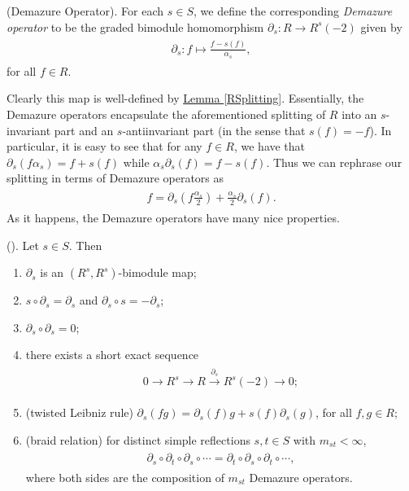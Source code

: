 \noindent\begin{definition}\textup{(Demazure Operator).} For each $s \in S$, we define the corresponding {\em Demazure operator} to be the graded bimodule homomorphism $\partial_s : R \to R^s(-2)$ given by
\begin{align*}
\begin{split}
\partial_s : f \mapsto \frac{f - s(f)}{\alpha_s},
\end{split}
\end{align*}
for all $f \in R$.\\
\end{definition}

\noindent Clearly this map is well-defined by \hyperref[RSplitting]{Lemma \ref*{RSplitting}}. Essentially, the Demazure operators encapsulate the aforementioned splitting of $R$ into an $s$-invariant part and an $s$-antiinvariant part (in the sense that $s(f) = -f$). In particular, it is easy to see that for any $f \in R$, we have that $\partial_s(f\alpha_s) = f + s(f)$ while $\alpha_s\partial_s(f) = f - s(f)$. Thus we can rephrase our splitting in terms of Demazure operators as
\begin{align*}
\begin{split}
f = \partial_s\left(f\frac{\alpha_s}{2}\right) + \frac{\alpha_s}{2}\partial_s(f).
\end{split}
\end{align*}
\noindent As it happens, the Demazure operators have many nice properties.\\

\noindent\begin{lemma}\textup{(\cite[Lemma 4.15]{EMTW20}).} Let $s \in S$. Then
\begin{enumerate}[label=\textup{(\roman*).}, ref=\textup{(\roman*)}, leftmargin=4\parindent]
\item $\partial_s$ is an $(R^s, R^s)$-bimodule map;
\item $s \circ \partial_s = \partial_s$ and $\partial_s \circ s = -\partial_s$;
\item $\partial_s \circ \partial_s = 0$;
\item there exists a short exact sequence
\begin{align*}
\begin{split}
0 \to R^s \to R \overset{\partial_s}{\to} R^s(-2) \to 0;
\end{split}
\end{align*}
\item (twisted Leibniz rule) $\partial_s(fg) = \partial_s(f)g + s(f)\partial_s(g)$, for all $f, g \in R$;
\item\label{DemazureBraid} (braid relation) for distinct simple reflections $s, t \in S$ with $m_{st} < \infty$,
\begin{align*}
\begin{split}
\partial_s \circ \partial_t \circ \partial_s \circ \cdots = \partial_t \circ \partial_s \circ \partial_t \circ \cdots,
\end{split}
\end{align*}
where both sides are the composition of $m_{st}$ Demazure operators.\\
\end{enumerate}
\end{lemma}

